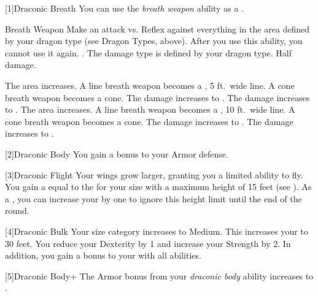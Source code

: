             [1]{Draconic Breath} You can use the \textit{breath weapon} ability as a .
            \begin{activeability}{Breath Weapon}
                \rankline
                Make an attack vs. Reflex against everything in the area defined by your dragon type (see Dragon Types, above).
                After you use this ability, you  cannot use it again.
                \hit \damageranktwo{}.
                The damage type is defined by your dragon type.
                \miss Half damage.

                \rankline
                 The area increases.
                    A line breath weapon becomes a \arealarge, 5 ft.\ wide line.
                    A cone breath weapon becomes a \areamed cone.
                 The damage increases to \damagerankthree{}.
                 The damage increases to \damagerankfour{}.
                 The area increases.
                    A line breath weapon becomes a \areahuge, 10 ft.\ wide line.
                    A cone breath weapon becomes a \arealarge cone.
                 The damage increases to \damageranksix{}.
                 The damage increases to \damagerankseven{}.
            \end{activeability}

            [2]{Draconic Body} You gain a  bonus to your Armor defense.

            [3]{Draconic Flight} Your wings grow larger, granting you a limited ability to fly.
            You gain a  equal to the  for your size with a maximum height of 15 feet (see ).
            As a , you can increase your  by one to ignore this height limit until the end of the round.

            [4]{Draconic Bulk} Your size category increases to Medium.
            This increases your  to 30 feet.
            You reduce your Dexterity by 1 and increase your Strength by 2.
            In addition, you gain a  bonus to your  with all abilities.

            [5]{Draconic Body+} The Armor bonus from your \textit{draconic body} ability increases to .

